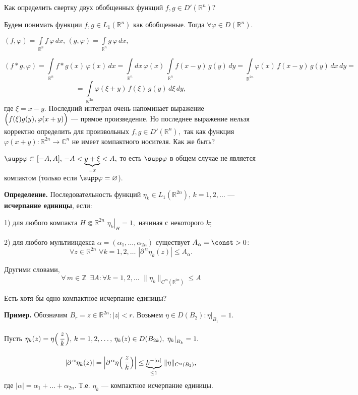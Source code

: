 \documentclass[12pt,a4paper,draft]{article}
\DeclareRobustCommand*{\т}{~--- }
\DeclareRobustCommand*{\ч}{~-- }
\begin{document}
Как определить свертку двух обобщенных функций $f,g\in D'(\mathbb
R^n)$?

Будем понимать функции $f,g\in L_1(\mathbb R^n)$ как обобщенные.
Тогда $\forall\varphi\in D(\mathbb R^n).$

$(f,\varphi)=\int\limits_{\mathbb R^n}f\,\varphi\,dx,\,
(g,\varphi)=\int\limits_{\mathbb R^n}g\,\varphi\,dx,$

$$(f*g,\varphi)=\int\limits_{\mathbb R^n}f*g(x)\,\varphi(x)\,dx=
\int\limits_{\mathbb R^n}dx\,\varphi(x)\, \int\limits_{\mathbb
R^n}f(x-y)\,g(y)\,dy= \int\limits_{\mathbb
R^{2n}}\varphi(x)\,f(x-y)\,g(y)\,dx\,dy=$$
 $$=\int\limits_{\mathbb
R^{2n}}\varphi(\xi+y)\,f(\xi)\,g(y)\,d\xi\,dy,$$ где $\xi=x-y.$
Последний интеграл очень напоминает выражение
$\Bigl(f(\xi)g(y),\varphi(x+y)\Bigr)$ --- прямое произведение. Но
последнее выражение нельзя корректно определить для произвольных
$f,g\in D'(\mathbb R^n),$ так как функция $\varphi(x+y)\colon
\mathbb R^{2n}\to\mathbb C^n$ не имеет компактного носителя. Как
же быть?

$\supp \varphi\subset[-A,A], \,-A<\underbrace{y+\xi}_{=x}<A,$ то
есть $\supp \varphi$ в общем случае не является компактом (только
если $\supp \varphi=\varnothing$).

\textbf{Определение.} Последовательность функций $\eta_k\in
L_1(\mathbb R^{2n}),\,k=1,2,\ldots$ --- \textbf{исчерпание
единицы}, если:

1) для любого компакта $H\Subset\mathbb R^{2n}\,\,
\left.\eta_k\right|_H=1,$ начиная с некоторого $k$;

2) для любого мультииндекса $\alpha=(\alpha_1,\ldots,\alpha_{2n})$
существует $A_{\alpha}=\const  >0\colon$
$$\forall z\in\mathbb
R^{2n}\,\, \forall k=1,2,\ldots\,\,
|\partial^{\,\alpha}\eta_k(z)|\le A_{\alpha}.$$

Другими словами, $$\forall\, m\in \mathbb Z \,\,\,\exists A\colon
\forall k=1,2,\ldots\,\,\|\eta_k\|_{C^m(\mathbb R^{2n})}\le A$$

Есть хотя бы одно компактное исчерпание единицы?

\textbf{Пример.} Обозначим $B_r={z\in\mathbb R^{2n}\colon |z|<r}.$
Возьмем $\eta\in D(B_2)\colon \left.\eta\right|_{B_1}=1.$

Пусть $\eta_k(z)=\eta\Bigl(\,\cfrac zk\,\Bigr),\,k=1,2,\ldots,\,
\eta_k(z)\in D(B_{2k}),\, \left.\eta_k\right|_{B_k}=1.$

$$|\partial^{\,\alpha}\eta_k(z)|=\Bigl|\partial^{\,\alpha}\eta\Bigl(\,\cfrac
zk\,\Bigr)\Bigr|\le
\underbrace{k^{-|\alpha|}}_{\le1}\,\|\eta\|_{C^{\alpha}(B_2)},$$
где $|\alpha|=\alpha_1+\ldots+\alpha_{2n}$. Т.е. $\eta_k$ ---
компактное исчерпание единицы.
\end{document}
